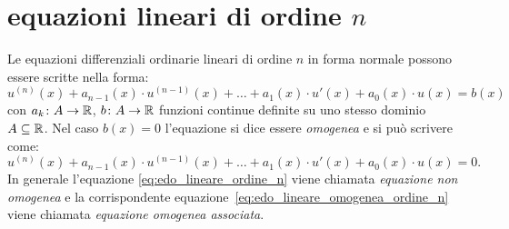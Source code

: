\section{equazioni lineari di ordine $n$}
\label{sec:edo_lineari}

Le equazioni differenziali ordinarie lineari di ordine $n$ in forma normale possono essere scritte nella forma:
\begin{equation}\label{eq:edo_lineare_ordine_n}
  u^{(n)}(x) + a_{n-1}(x) \cdot u^{(n-1)}(x) + \dots + a_1(x) \cdot u'(x) + a_0(x) \cdot u(x) = b(x)
\end{equation}
con $a_k\colon A \to {\mathbb R}$, $b\colon A\to {\mathbb R}$ funzioni continue definite su uno stesso dominio $A\subseteq {\mathbb R}$.
Nel caso $b(x) = 0$ l'equazione si dice essere \emph{omogenea}%
e si può scrivere come:
\begin{equation}\label{eq:edo_lineare_omogenea_ordine_n}
  u^{(n)}(x) + a_{n-1}(x) \cdot u^{(n-1)}(x) + \dots + a_1(x)\cdot u'(x) + a_0(x)\cdot u(x) = 0.
\end{equation}
In generale l'equazione \eqref{eq:edo_lineare_ordine_n}
viene chiamata \emph{equazione non omogenea}
e la corrispondente equazione~\eqref{eq:edo_lineare_omogenea_ordine_n}
viene chiamata \emph{equazione omogenea associata}.

